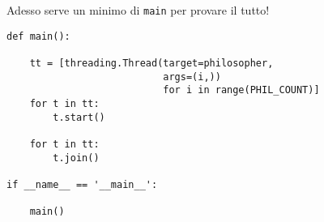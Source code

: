 \documentclass{article}
\begin{document}
Adesso serve un minimo di \texttt{main} per provare il tutto!

\begin{verbatim}
def main():

    tt = [threading.Thread(target=philosopher,
                           args=(i,))
                           for i in range(PHIL_COUNT)]
    for t in tt:
        t.start()

    for t in tt:
        t.join()

if __name__ == '__main__':

    main()
\end{verbatim}
\end{document}
